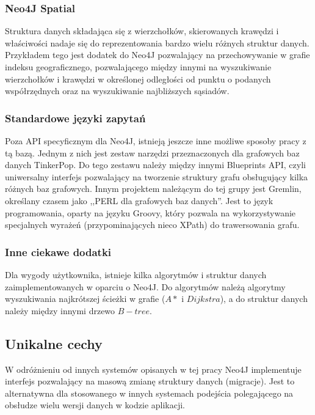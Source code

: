 \subsubsection*{Neo4J Spatial}

Struktura danych składająca się z wierzchołków, skierowanych krawędzi i właściwości nadaje się do reprezentowania bardzo wielu różnych struktur danych.
Przykładem tego jest dodatek do Neo4J pozwalający na przechowywanie w grafie indeksu geograficznego, pozwalającego między innymi na wyszukiwanie wierzchołków i krawędzi w określonej odległości od punktu o podanych współrzędnych oraz na wyszukiwanie najbliższych sąsiadów.

\subsubsection*{Standardowe języki zapytań}

Poza API specyficznym dla Neo4J, istnieją jeszcze inne możliwe sposoby pracy z tą bazą.
Jednym z nich jest zestaw narzędzi przeznaczonych dla grafowych baz danych TinkerPop.
Do tego zestawu należy między innymi Blueprints API, czyli uniwersalny interfejs pozwalający na tworzenie struktury grafu obsługujący kilka różnych baz grafowych.
Innym projektem należącym do tej grupy jest Gremlin, określany czasem jako ,,PERL dla grafowych baz danych''.
Jest to język programowania, oparty na języku Groovy, który pozwala na wykorzystywanie specjalnych wyrażeń (przypominających nieco XPath) do trawersowania grafu.

\subsubsection*{Inne ciekawe dodatki}

Dla wygody użytkownika, istnieje kilka algorytmów i struktur danych zaimplementowanych w oparciu o Neo4J.
Do algorytmów należą algorytmy wyszukiwania najkrótszej ścieżki w grafie ($A*$ i $Dijkstra$), a do struktur danych należy między innymi drzewo $B-tree$.

\subsection*{Unikalne cechy}

W odróżnieniu od innych systemów opisanych w tej pracy Neo4J implementuje interfejs pozwalający na masową zmianę struktury danych (migracje).
Jest to alternatywna dla stosowanego w innych systemach podejścia polegającego na obsłudze wielu wersji danych w kodzie aplikacji.

